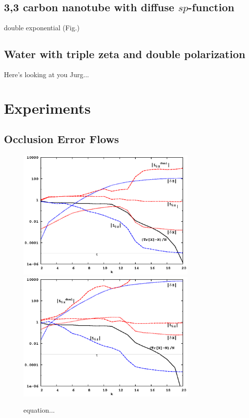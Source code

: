 \documentclass[letterpaper,twocolumn,amsmath,amsfont,amssymb,english,aps,jcp,preprintnumbers,groupaddress,nofootinbib,tightenlines]{revtex4}
\begin{document}
\subsection{ 3,3 carbon nanotube with diffuse $sp$-function}
double exponential (Fig.)

\subsection{Water with triple zeta and double polarization}
Here's looking at you Jurg...

\section{Experiments}

\subsection{Occlusion Error Flows}
\begin{figure}[h]
  \caption{equation...}
 \includegraphics[width=3.5in]{8x_33_nanotube_cond10_tau-5.eps}
 \includegraphics[width=3.5in]{8x_33_nanotube_cond10_tau-3.eps}
\end{figure}
\end{document}
